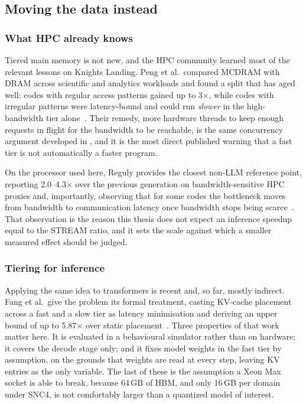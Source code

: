\subsection{Moving the data instead}
\label{sec:lit-placement}

\subsubsection{What HPC already knows}

Tiered main memory is not new, and the HPC community learned most of the
relevant lessons on Knights Landing.  Peng et al.\ compared MCDRAM with
DRAM across scientific and analytics workloads and found a split that
has aged well: codes with regular access patterns gained up to
3$\times$, while codes with irregular patterns were latency-bound and
could run \emph{slower} in the high-bandwidth tier
alone~\cite{peng2017hybridmemory}.  Their remedy, more hardware threads to keep enough requests in flight
for the bandwidth to be reachable, is the same concurrency argument
developed in , and it is the most direct published
warning that a fast tier is not automatically a faster program.

On the processor used here, Reguly provides the closest non-LLM
reference point, reporting 2.0--4.3$\times$ over the previous generation
on bandwidth-sensitive HPC proxies and, importantly, observing that for
some codes the bottleneck moves from bandwidth to communication
latency once bandwidth stops being scarce~\cite{reguly2023xeonmax}.  That
observation is the reason this thesis does not expect an inference
speedup equal to the STREAM ratio, and it sets the scale against which a
smaller measured effect should be judged.

\subsubsection{Tiering for inference}

Applying the same idea to transformers is recent and, so far, mostly
indirect.  Fang et al.\ give the problem its formal treatment, casting
KV-cache placement across a fast and a slow tier as latency
minimisation and deriving an upper bound of up to 5.87$\times$ over
static placement~\cite{fang2025kvplacement}.  Three properties of that
work matter here.  It is evaluated in a behavioural simulator rather
than on hardware; it covers the decode stage only; and it fixes model
weights in the fast tier by assumption, on the grounds that weights are
read at every step, leaving KV entries as the only variable.  The last
of these is the assumption a Xeon Max socket is able to break, because
64\,GB of HBM, and only 16\,GB per domain under SNC4, is not comfortably
larger than a quantized model of interest.

